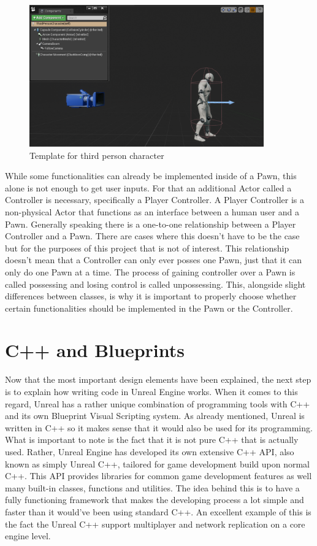 \begin{figure}[htpb]
	\centering
	\includegraphics[width=0.9\textwidth]{fig/UnrealCharacter.png}
	\caption[Template for third person character]{Template for third person character\protect}
	\label{fig:UnrealCharacter}
\end{figure}

While some functionalities can already be implemented inside of a Pawn, this alone is not enough to get user inputs. For that an additional Actor called a Controller is necessary, specifically a Player Controller. A Player Controller is a non-physical Actor that functions as an interface between a human user and a Pawn. Generally speaking there is a one-to-one relationship between a Player Controller and a Pawn. There are cases where this doesn't have to be the case but for the purposes of this project that is not of interest. This relationship doesn't mean that a Controller can only ever posses one Pawn, just that it can only do one Pawn at a time. The process of gaining controller over a Pawn is called possessing and losing control is called unpossessing. This, alongside slight differences between classes, is why it is important to properly choose whether certain functionalities should be implemented in the Pawn or the Controller.

\section{C++ and Blueprints}

Now that the most important design elements have been explained, the next step is to explain how writing code in Unreal Engine works. When it comes to this regard, Unreal has a rather unique combination of programming tools with C++ and its own Blueprint Visual Scripting system. As already mentioned, Unreal is written in C++ so it makes sense that it would also be used for its programming. What is important to note is the fact that it is not pure C++ that is actually used. Rather, Unreal Engine has developed its own extensive C++ API, also known as simply Unreal C++, tailored for game development build upon normal C++. This API provides libraries for common game development features as well many built-in classes, functions and utilities. The idea behind this is to have a fully functioning framework that makes the developing process a lot simple and faster than it would've been using standard C++. An excellent example of this is the fact the Unreal C++ support multiplayer and network replication on a core engine level.\\

